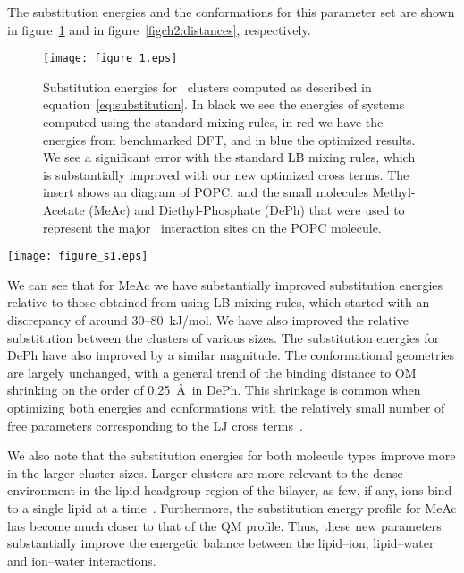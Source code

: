 The substitution energies and the conformations for
this parameter set are shown in figure~\ref{figch2:energies} 
and in figure~\ref{figch2:distances}, respectively. 
\begin{figure}[h!tb]
    \texttt{[image: figure\_1.eps]}
    \caption[Substitution energies for \na~clusters]{Substitution energies for \na~clusters computed as described
in equation~\ref{eq:substitution}. 
In black we see the energies of systems computed using the standard 
mixing rules, in red we have the energies from benchmarked DFT, 
and in blue the optimized results. 
We see a significant
error with the standard LB mixing rules, which is substantially improved with our new optimized cross terms. 
The insert shows an diagram of POPC, and
the small molecules Methyl-Acetate (MeAc) and Diethyl-Phosphate (DePh) 
that were used to represent the major \na~interaction sites on the POPC molecule.}
    \label{figch2:energies}
\end{figure}
\begin{sidewaysfigure}[h!tb]
    \centering
    \caption[Distances from \na to each component atom in sample clusters]{Distances from \na to each component atom in sample clusters. We compute the geometry of our sample clusters by computing the distance from
    the ion to each other atom in the system, shown per atom type.
    These distances are used in combination with the substitution energies in figure 2 to compute the
error for the NM optimization.}
    \label{figch2:distances}
    \texttt{[image: figure\_s1.eps]}
\end{sidewaysfigure}
We can see that for MeAc we have substantially improved substitution
energies relative to those obtained from using LB mixing rules, 
which started with an discrepancy of around 30--80~kJ/mol. We have also
improved the relative substitution between the clusters of various sizes. 
The substitution energies for DePh have also improved by a similar magnitude. 
The conformational geometries are largely unchanged, 
with a general trend of the binding distance to OM\* shrinking on the order of 0.25~\AA~in DePh. 
This shrinkage is common when optimizing both energies and conformations
with the relatively small number of free parameters corresponding to
the LJ cross terms~\cite{wineman:2019}.

We also note that the substitution energies for both molecule types improve more in the
larger cluster sizes. Larger clusters are more relevant to the dense
environment in the lipid headgroup region of the bilayer, 
as few, if any, ions bind to a single lipid at a time~\cite{kruczek:2017}. 
Furthermore, the substitution energy profile for MeAc has become much closer to that of the QM profile. 
Thus, these new parameters substantially improve the energetic balance
between the lipid--ion, lipid--water and ion--water interactions.

